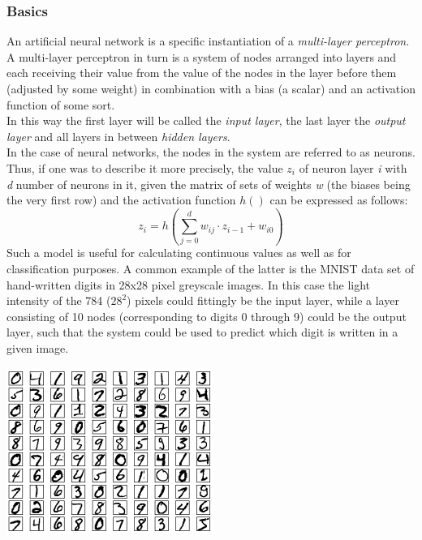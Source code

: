 \subsubsection{Basics}
An artificial neural network is a specific instantiation of a \textit{multi-layer perceptron}.
A multi-layer perceptron in turn is a system of nodes arranged into layers and each receiving their value from the value of the nodes in the layer before them (adjusted by some weight) in combination with a bias (a scalar) and an activation function of some sort. \\
In this way the first layer will be called the \textit{input layer}, the last layer the \textit{output layer} and all layers in between \textit{hidden layers}. \\
In the case of neural networks, the nodes in the system are referred to as neurons.
Thus, if one was to describe it more precisely, the value $z_i$ of neuron layer \textit{i} with \textit{d} number of neurons in it, given the matrix of sets of weights \textit{w} (the biases being the very first row) and the activation function $h()$ can be expressed as follows:
\[
z_i = h\left(\sum_{j=0}^d w_{ij}\cdot z_{i-1} + w_{i0}\right)
\]
Such a model is useful for calculating continuous values as well as for classification purposes. A common example of the latter is the MNIST data set of hand-written digits in 28x28 pixel greyscale images. In this case the light intensity of the 784 ($28^2$) pixels could fittingly be the input layer, while a layer consisting of 10 nodes (corresponding to digits 0 through 9) could be the output layer, such that the system could be used to predict which digit is written in a given image.

\begin{Figure}
 \centering
 \includegraphics[width=0.7\linewidth]{images/mnist}
\end{Figure}

